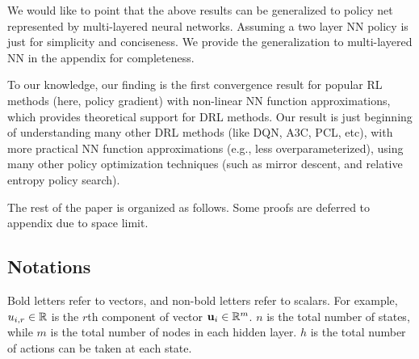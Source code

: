 We would like to point that the above results can be generalized to policy net represented by multi-layered neural networks. Assuming a two layer NN policy is just for simplicity and conciseness. We provide the generalization to multi-layered NN in the appendix for completeness.

To our knowledge, our finding is the first convergence result for popular RL methods (here, policy gradient) with non-linear NN function approximations, which provides theoretical support for DRL methods. Our result is just beginning of understanding many other DRL methods (like DQN, A3C, PCL, etc), with more practical NN function approximations (e.g., less overparameterized), using many other policy optimization techniques (such as mirror descent, and relative entropy policy search).

The rest of the paper is organized as follows. Some proofs are deferred to appendix due to space limit.

\subsection{Notations}

Bold letters refer to vectors, and non-bold letters refer to scalars. For example, $u_{i,r} \in {\mathbb{R}}$ is the $r$th component of vector ${\mathbf{u}}_i \in {\mathbb{R}}^m$. $n$ is the total number of states, while $m$ is the total number of nodes in each hidden layer. $h$ is the total number of actions can be taken at each state.

